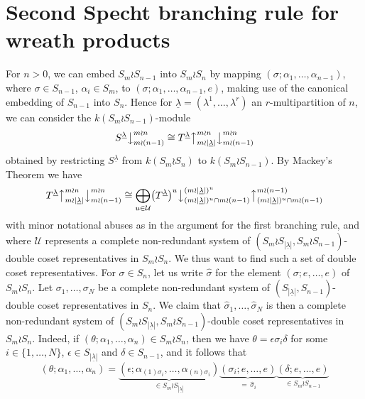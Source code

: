 \documentclass[10pt]{article}
\theoremstyle{definition}
\newcommand{\ul}[1]{\underline{#1}}
\begin{document}
\section{Second Specht branching rule for wreath products}
For $n>0$, we can embed $S_m \wr S_{n-1}$ into $S_m \wr S_n$ by mapping $(\sigma;\alpha_1,\ldots,\alpha_{n-1})$, where
$\sigma \in S_{n-1}$, $\alpha_i \in S_m$, to $ (\sigma;\alpha_1,\ldots,\alpha_{n-1},e)$, making use of the canonical embedding of
$S_{n-1}$ into $S_n$.
Hence for $\ul{\lambda} = (\lambda^1,\ldots,\lambda^r)$ an $r$-multipartition of $n$, we can consider the $k(S_m \wr S_{n-1})$-module
\[ S^{\ul{\lambda}}\bigr\downarrow^{m \wr n}_{m \wr (n-1)} \cong
T^{\ul{\lambda}}\bigr\uparrow^{m{\wr}n}_{m{\wr}|\ul{\lambda}|}\bigr\downarrow^{m \wr n}_{m \wr (n-1)}\]
obtained by restricting $S^{\ul{\lambda}}$ from $k(S_m \wr S_n)$ to $k(S_m \wr S_{n-1})$. By Mackey's Theorem we have
\begin{equation}\label{res_Sp_mwrnsub_mackey:eq}
T^{\ul{\lambda}}\bigr\uparrow^{m{\wr}n}_{m{\wr}|\ul{\lambda}|}\bigr\downarrow^{m \wr n}_{m \wr (n-1)}
\cong
\bigoplus_{u \in \mathcal{U}}\bigl(T^{\ul{\lambda}}\bigr)^u\bigl\downarrow^{(m{\wr}|\ul{\lambda}|)^u}_{(m{\wr}|\ul{\lambda}|)^u \cap m \wr (n-1)}
\bigl\uparrow^{m \wr (n-1)}_{(m{\wr}|\ul{\lambda}|)^u \cap m \wr (n-1)}
\end{equation}
with minor notational abuses as in the argument for the first branching rule, and where $\mathcal{U}$ represents a complete non-redundant
system of $(S_m \wr S_{|\ul{\lambda}|},S_m \wr S_{n-1})$-double coset representatives in $S_m \wr S_n$. We thus want to find such a set of
double coset representatives. For  $\sigma \in S_n$, let us write $\hat\sigma$ for the element $(\sigma;e,\ldots,e)$ of $S_m \wr S_n$.
Let $\sigma_1,\ldots,\sigma_N$ be a complete non-redundant system of $(S_{|\ul{\lambda}|},S_{n-1})$-double coset representatives in $S_n$. We
claim that $\hat\sigma_1,\ldots,\hat\sigma_N$ is then a complete non-redundant system of $(S_m \wr S_{|\ul{\lambda}|},S_m \wr S_{n-1})$-double
coset representatives in $S_m \wr S_n$. Indeed, if $(\theta;\alpha_1,\ldots,\alpha_n) \in S_m \wr S_n$, then we have
$\theta = \epsilon \sigma_i \delta$
for some $i \in \{1,\ldots,N\}$, $\epsilon \in S_{|\ul{\lambda}|}$ and $\delta \in S_{n-1}$, and it follows that
\[
(\theta;\alpha_1,\ldots,\alpha_n) =
\underbrace{(\epsilon;\alpha_{(1)\sigma_i},\ldots,\alpha_{(n)\sigma_i})}_{\in S_m \wr S_{|\ul{\lambda}|}}
\underbrace{(\sigma_i;e,\ldots,e)}_{=\,\hat\sigma_i}
\underbrace{(\delta;e,\ldots,e)}_{\in S_m \wr S_{n-1}}
\]
\end{document}
